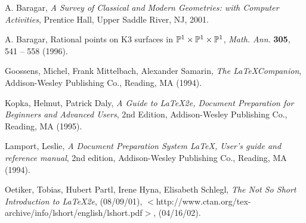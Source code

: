 \begin{thebibliography}{99}
 \begin{spacing}{1} %
    A. Baragar, {\it A Survey of Classical and Modern
    Geometries: with Computer Activities}, Prentice Hall, Upper Saddle
    River, NJ, 2001.

    A. Baragar, Rational points on K3 surfaces in $\Bbb P^1\times
    \Bbb P^1\times \Bbb P^1$, {\it Math. Ann.} {\bf 305}, 541 -- 558
    (1996).  %

    Goossens, Michel, Frank Mittelbach, Alexander Samarin,
    {\it The \LaTeX Companion},
    Addison-Wesley Publishing Co., Reading, MA (1994).

    Kopka, Helmut, Patrick Daly, {\it A Guide to \LaTeX2e,
    Document Preparation for Beginners and Advanced Users}, 2nd
    Edition, Addison-Wesley Publishing Co., Reading, MA (1995).

    Lamport, Leslie,
    {\it A Document Preparation System \LaTeX, User's guide and reference manual},
    2nd edition, Addison-Wesley Publishing Co., Reading, MA (1994).

    Oetiker, Tobias, Hubert Partl, Irene Hyna, Elisabeth Schlegl,
    {\it The Not So Short Introduction to \LaTeX2e}, (08/09/01),
    $<$http://www.ctan.org/tex-archive/info/lshort/english/lshort.pdf$>$,
    (04/16/02). %
 \end{spacing}
\end{thebibliography}

